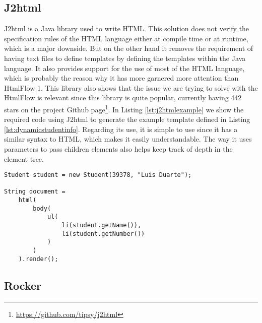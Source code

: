 \subsection{J2html} %
\label{sec:j2html}

J2html\cite{j2html} is a Java library used to write \ac{HTML}. This solution does not verify the specification rules of the \ac{HTML} language either at compile time or at runtime, which is a major downside. But on the other hand it removes the requirement of having text files to define templates by defining the templates within the Java language. It also provides support for the use of most of the \ac{HTML} language, which is probably the reason why it has more garnered more attention than HtmlFlow 1. This library also shows that the issue we are trying to solve with the HtmlFlow is relevant since this library is quite popular, currently having 442 stars on the project Github page\footnote{\url{https://github.com/tipsy/j2html}}. In Listing \ref{lst:j2htmlexample} we show the required code using J2html to generate the example template defined in Listing \ref{lst:dynamicstudentinfo}. Regarding its use, it is simple to use since it has a similar syntax to \ac{HTML}, which makes it easily understandable. The way it uses parameters to pass children elements also helps keep track of depth in the element tree.

\bigskip


\begin{minipage}{\linewidth}
\begin{lstlisting}[caption={J2html Code Example}, label={lst:j2htmlexample}]
Student student = new Student(39378, "Luis Duarte");
        
String document =
    html(
        body(
            ul(
                li(student.getName()),
                li(student.getNumber())
            )
        )
    ).render();
\end{lstlisting}
\end{minipage}

\subsection{Rocker}
\label{sec:rocker}

